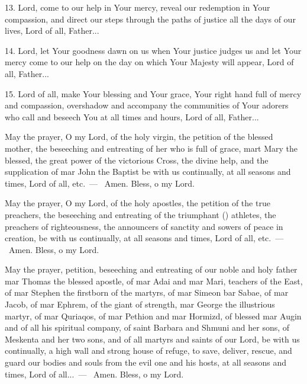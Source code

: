 \documentclass[12pt,twoside,a5paper]{article}
\begin{document}
13. Lord, come to our help in Your mercy, reveal our redemption in Your compassion, and direct our steps through the paths of justice all the days of our lives, Lord of all, Father...

14. Lord, let Your goodness dawn on us when Your justice judges us and let Your mercy come to our help on the day on which Your Majesty will appear, Lord of all, Father...

15. Lord of all, make Your blessing and Your grace, Your right hand full of mercy and compassion, overshadow and accompany the communities of Your adorers who call and beseech You at all times and hours, Lord of all, Father...




 May the prayer, O my Lord, of the holy virgin, the petition of the blessed mother, the beseeching and entreating of her who is full of grace, mart Mary the blessed, the great power of the victorious Cross, the divine help, and the supplication of mar John the Baptist be with us continually, at all seasons and times, Lord of all, etc.~--- \rr~Amen. Bless, o my Lord.

 May the prayer, O my Lord, of the holy apostles, the petition of the true preachers, the beseeching and entreating of the triumphant () athletes, the preachers of righteousness, the announcers of sanctity and sowers of peace in creation, be with us continually, at all seasons and times, Lord of all, etc.~--- \rr~Amen. Bless, o my Lord.

 May the prayer, petition, beseeching and entreating of our noble and holy father mar Thomas the blessed apostle, of mar Adai and mar Mari, teachers of the East, of mar Stephen the firstborn of the martyrs, of mar Simeon bar Sabae, of mar Jacob, of mar Ephrem, of the giant of strength, mar George the illustrious martyr, of mar Quriaqos, of mar Pethion and mar Hormizd, of blessed mar Augin and of all his spiritual company, of saint Barbara and Shmuni and her sons, of Meskenta and her two sons, and of all martyrs and saints of our Lord, be with us continually, a high wall and strong house of refuge, to save, deliver, rescue, and guard our bodies and souls from the evil one and his hosts, at all seasons and times, Lord of all...~--- \rr~Amen. Bless, o my Lord.
\end{document}
